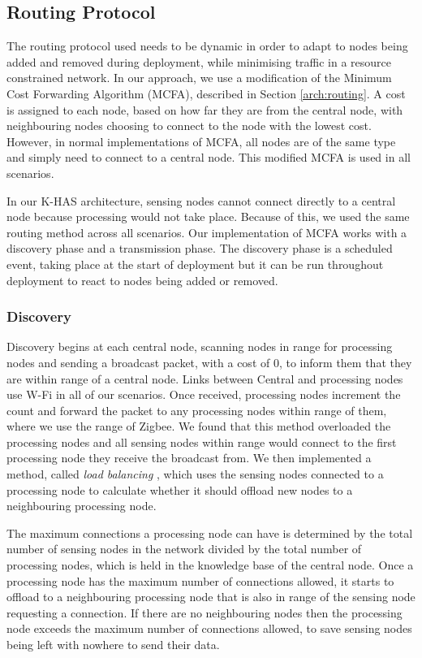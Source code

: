 \subsection{Routing Protocol}
The routing protocol used needs to be dynamic in order to adapt to nodes being added and removed during deployment, while minimising traffic in a resource constrained network. In our approach, we use a modification of the Minimum Cost Forwarding Algorithm (MCFA), described in Section \ref{arch:routing}. A cost is assigned to each node, based on how far they are from the central node, with neighbouring nodes choosing to connect to the node with the lowest cost. However, in normal implementations of MCFA, all nodes are of the same type and simply need to connect to a central node. This modified MCFA is used in all scenarios.

In our K-HAS architecture, sensing nodes cannot connect directly to a central node because processing would not take place. Because of this, we used the same routing method across all scenarios. Our implementation of MCFA works with a discovery phase and a transmission phase. The discovery phase is a scheduled event, taking place at the start of deployment but it can be run throughout deployment to react to nodes being added or removed. 

\subsubsection{Discovery}\label{sim:disc}
	Discovery begins at each central node, scanning nodes in range for processing nodes and sending a broadcast packet, with a cost of 0, to inform them that they are within range of a central node. Links between Central and processing nodes use W-Fi in all of our scenarios. Once received, processing nodes increment the count and forward the packet to any processing nodes within range of them, where we use the range of Zigbee. We found that this method overloaded the processing nodes and all sensing nodes within range would connect to the first processing node they receive the broadcast from. We then implemented a method, called \textit{load balancing} \cite{Gupta2003}, which uses the sensing nodes connected to a processing node to calculate whether it should offload new nodes to a neighbouring processing node.
	
	The maximum connections a processing node can have is determined by the total number of sensing nodes in the network divided by the total number of processing nodes, which is held in the knowledge base of the central node. Once a processing node has the maximum number of connections allowed, it starts to offload to a neighbouring processing node that is also in range of the sensing node requesting a connection. If there are no neighbouring nodes then the processing node exceeds the maximum number of connections allowed, to save sensing nodes being left with nowhere to send their data.
	

